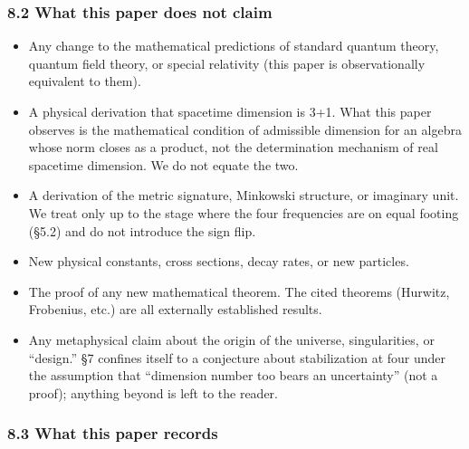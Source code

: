 \documentclass[
]{article}
\providecommand{\tightlist}{%
  \setlength{\itemsep}{0pt}\setlength{\parskip}{0pt}}
\begin{document}
\subsubsection{8.2 What this paper does not
claim}\label{what-this-paper-does-not-claim}

\begin{itemize}
\tightlist
\item
  Any change to the mathematical predictions of standard quantum theory,
  quantum field theory, or special relativity (this paper is
  observationally equivalent to them).
\item
  A physical derivation that spacetime dimension is 3+1. What this paper
  observes is the mathematical condition of admissible dimension for an
  algebra whose norm closes as a product, not the determination
  mechanism of real spacetime dimension. We do not equate the two.
\item
  A derivation of the metric signature, Minkowski structure, or
  imaginary unit. We treat only up to the stage where the four
  frequencies are on equal footing (§5.2) and do not introduce the sign
  flip.
\item
  New physical constants, cross sections, decay rates, or new particles.
\item
  The proof of any new mathematical theorem. The cited theorems
  (Hurwitz, Frobenius, etc.) are all externally established results.
\item
  Any metaphysical claim about the origin of the universe,
  singularities, or ``design.'' §7 confines itself to a conjecture about
  stabilization at four under the assumption that ``dimension number too
  bears an uncertainty'' (not a proof); anything beyond is left to the
  reader.
\end{itemize}

\subsubsection{8.3 What this paper
records}\label{what-this-paper-records}
\end{document}
